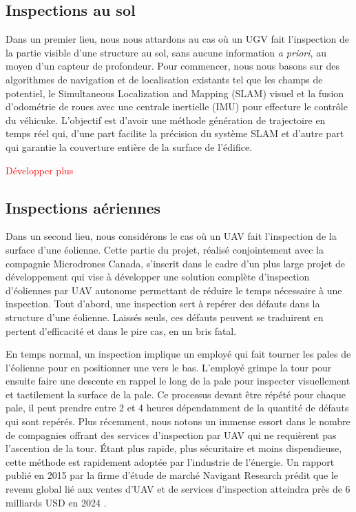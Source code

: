 \subsection{Inspections au sol}
Dans un premier lieu, nous nous attardons au cas où un UGV fait l'inspection de la partie visible d'une structure au sol, sans aucune information \textit{a priori}, au moyen d'un capteur de profondeur. Pour commencer, nous nous basons sur des algorithmes de navigation et de localisation existants tel que les champs de potentiel, le Simultaneous Localization and Mapping (SLAM) visuel et la fusion d'odométrie de roues avec une centrale inertielle (IMU) pour effecture le contrôle du véhicuke. L'objectif est d'avoir une méthode génération de trajectoire en temps réel qui, d'une part facilite la précision du système SLAM et d'autre part qui garantie la couverture entière de la surface de l'édifice.

\textcolor{red}{Développer plus}

\subsection{Inspections aériennes}
Dans un second lieu, nous considérons le cas où un UAV fait l'inspection de la surface d'une éolienne. Cette partie du projet, réalisé conjointement avec la compagnie Microdrones Canada, s'inscrit dans le cadre d'un plus large projet de développement qui vise à développer une solution complète d'inspection d'éoliennes par UAV autonome permettant de réduire le temps nécessaire à une inspection. Tout d'abord, une inspection sert à repérer des défauts dans la structure d'une éolienne. Laissés seuls, ces défauts peuvent se traduirent en pertent d'efficacité et dans le pire cas, en un bris fatal.

En temps normal, un inspection implique un employé qui fait tourner les pales de l'éolienne pour en positionner une vers le bas. L'employé grimpe la tour pour ensuite faire une descente en rappel le long de la pale pour inspecter visuellement et tactilement la surface de la pale. Ce processus devant être répété pour chaque pale, il peut prendre entre 2 et 4 heures dépendamment de la quantité de défauts qui sont repérés. Plus récemment, nous notons un immense essort dans le nombre de compagnies offrant des services d'inspection par UAV qui ne requièrent pas l'ascention de la tour. Étant plus rapide, plus sécuritaire et moins dispendieuse, cette méthode est rapidement adoptée par l'industrie de l'énergie. Un rapport publié en 2015 par la firme d'étude de marché Navigant Research prédit que le revenu global lié aux ventes d'UAV et de services d'inspection atteindra près de 6 milliards USD en 2024 \citep{navigant2015}.

